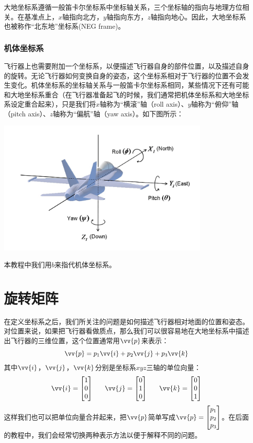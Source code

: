 \documentclass[11pt]{article}
\begin{document}
大地坐标系遵循一般笛卡尔坐标系中坐标轴关系，三个坐标轴的指向与地理方位相关。在基准点上，$x$轴指向北方，$y$轴指向东方，$z$轴指向地心。因此，大地坐标系也被称作“北东地”坐标系(NEG frame)。
\subsubsection{机体坐标系}\label{sec:bodyframe}
飞行器上也需要附加一个坐标系，以便描述飞行器自身的部件位置，以及描述自身的旋转。无论飞行器如何变换自身的姿态，这个坐标系相对于飞行器的位置不会发生变化。机体坐标系的坐标轴关系与一般笛卡尔坐标系相同，某些情况下还有可能和大地坐标系重合（在飞行器准备起飞的时候，我们通常把机体坐标系和大地坐标系设定重合起来），只是我们将$x$轴称为“横滚”轴（roll axis）、$y$轴称为“俯仰”轴（pitch axis）、$z$轴称为“偏航”轴（yaw axis）。如下图所示：
\begin{center}
\includegraphics[width=0.8\textwidth]{images/InertialFrame.png}
\end{center}

本教程中我们用$b$来指代机体坐标系。

\section{旋转矩阵}\label{sec:rotmtx}
在定义坐标系之后，我们所关注的问题是如何描述飞行器相对地面的位置和姿态。对位置来说，如果把飞行器看做质点，那么我们可以很容易地在大地坐标系中描述出飞行器的三维位置，这个位置通常用$\vv{p}$来表示：
$$
\vv{p} = p_1\vv{i}+p_2\vv{j}+p_3\vv{k}
$$
其中$\vv{i}$，$\vv{j}$，$\vv{k}$分别是坐标系$xyz$三轴的单位向量：
$$
\vv{i} = \begin{bmatrix}
1\\0\\0
\end{bmatrix}\ \ \ \ \ 
\vv{j} = \begin{bmatrix}
0\\1\\0
\end{bmatrix}\ \ \ \ \ 
\vv{k} = \begin{bmatrix}
0\\0\\1
\end{bmatrix}
$$
这样我们也可以把单位向量合并起来，把$\vv{p}$简单写成$\vv{p} = \begin{bmatrix}
p_1\\p_2\\p_3
\end{bmatrix}$。在后面的教程中，我们会经常切换两种表示方法以便于解释不同的问题。
\end{document}
